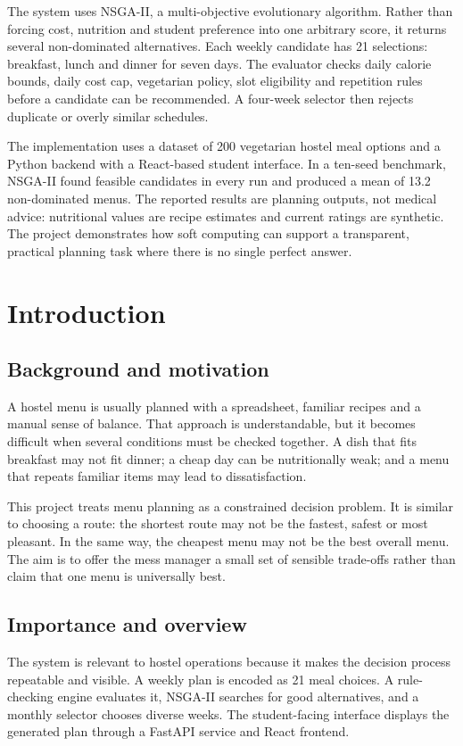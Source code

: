 \documentclass[12pt,a4paper]{report}
\begin{document}
The system uses NSGA-II, a multi-objective evolutionary algorithm. Rather than forcing cost, nutrition and student preference into one arbitrary score, it returns several non-dominated alternatives. Each weekly candidate has 21 selections: breakfast, lunch and dinner for seven days. The evaluator checks daily calorie bounds, daily cost cap, vegetarian policy, slot eligibility and repetition rules before a candidate can be recommended. A four-week selector then rejects duplicate or overly similar schedules.

The implementation uses a dataset of 200 vegetarian hostel meal options and a Python backend with a React-based student interface. In a ten-seed benchmark, NSGA-II found feasible candidates in every run and produced a mean of 13.2 non-dominated menus. The reported results are planning outputs, not medical advice: nutritional values are recipe estimates and current ratings are synthetic. The project demonstrates how soft computing can support a transparent, practical planning task where there is no single perfect answer.

\chapter{Introduction}
\section{Background and motivation}
A hostel menu is usually planned with a spreadsheet, familiar recipes and a manual sense of balance. That approach is understandable, but it becomes difficult when several conditions must be checked together. A dish that fits breakfast may not fit dinner; a cheap day can be nutritionally weak; and a menu that repeats familiar items may lead to dissatisfaction.

This project treats menu planning as a constrained decision problem. It is similar to choosing a route: the shortest route may not be the fastest, safest or most pleasant. In the same way, the cheapest menu may not be the best overall menu. The aim is to offer the mess manager a small set of sensible trade-offs rather than claim that one menu is universally best.

\section{Importance and overview}
The system is relevant to hostel operations because it makes the decision process repeatable and visible. A weekly plan is encoded as 21 meal choices. A rule-checking engine evaluates it, NSGA-II searches for good alternatives, and a monthly selector chooses diverse weeks. The student-facing interface displays the generated plan through a FastAPI service and React frontend.
\end{document}
